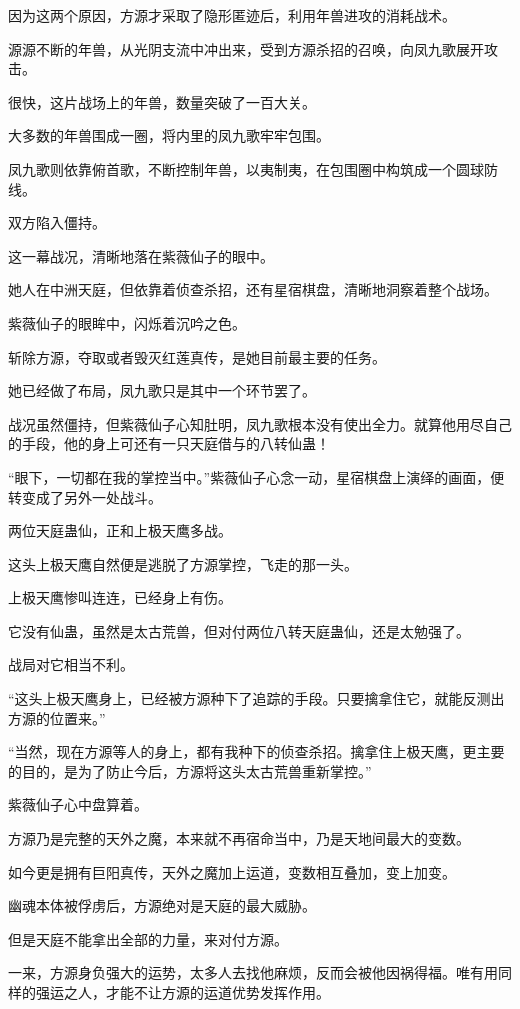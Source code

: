 \begin{this_body}
因为这两个原因，方源才采取了隐形匿迹后，利用年兽进攻的消耗战术。

源源不断的年兽，从光阴支流中冲出来，受到方源杀招的召唤，向凤九歌展开攻击。

很快，这片战场上的年兽，数量突破了一百大关。

大多数的年兽围成一圈，将内里的凤九歌牢牢包围。

凤九歌则依靠俯首歌，不断控制年兽，以夷制夷，在包围圈中构筑成一个圆球防线。

双方陷入僵持。

这一幕战况，清晰地落在紫薇仙子的眼中。

她人在中洲天庭，但依靠着侦查杀招，还有星宿棋盘，清晰地洞察着整个战场。

紫薇仙子的眼眸中，闪烁着沉吟之色。

斩除方源，夺取或者毁灭红莲真传，是她目前最主要的任务。

她已经做了布局，凤九歌只是其中一个环节罢了。

战况虽然僵持，但紫薇仙子心知肚明，凤九歌根本没有使出全力。就算他用尽自己的手段，他的身上可还有一只天庭借与的八转仙蛊！

“眼下，一切都在我的掌控当中。”紫薇仙子心念一动，星宿棋盘上演绎的画面，便转变成了另外一处战斗。

两位天庭蛊仙，正和上极天鹰多战。

这头上极天鹰自然便是逃脱了方源掌控，飞走的那一头。

上极天鹰惨叫连连，已经身上有伤。

它没有仙蛊，虽然是太古荒兽，但对付两位八转天庭蛊仙，还是太勉强了。

战局对它相当不利。

“这头上极天鹰身上，已经被方源种下了追踪的手段。只要擒拿住它，就能反测出方源的位置来。”

“当然，现在方源等人的身上，都有我种下的侦查杀招。擒拿住上极天鹰，更主要的目的，是为了防止今后，方源将这头太古荒兽重新掌控。”

紫薇仙子心中盘算着。

方源乃是完整的天外之魔，本来就不再宿命当中，乃是天地间最大的变数。

如今更是拥有巨阳真传，天外之魔加上运道，变数相互叠加，变上加变。

幽魂本体被俘虏后，方源绝对是天庭的最大威胁。

但是天庭不能拿出全部的力量，来对付方源。

一来，方源身负强大的运势，太多人去找他麻烦，反而会被他因祸得福。唯有用同样的强运之人，才能不让方源的运道优势发挥作用。


\end{this_body}
